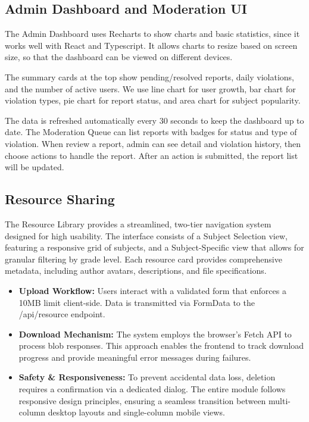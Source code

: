 \documentclass[a4paper,12pt]{report}
\begin{document}
\subsection{Admin Dashboard and Moderation UI}

The Admin Dashboard uses Recharts to show charts and basic statistics, since it works well with React and Typescript. It allows charts to resize based on screen size, so that the dashboard can be viewed on different devices.

The summary cards at the top show pending/resolved reports, daily violations, and the number of active users. We use line chart for user growth, bar chart for violation types, pie chart for report status, and area chart for subject popularity.

The data is refreshed automatically every 30 seconds to keep the dashboard up to date. The Moderation Queue can list reports with badges for status and type of violation. When review a report, admin can see detail and violation history, then choose actions to handle the report. After an action is submitted, the report list will be updated.

\subsection{Resource Sharing}

The Resource Library provides a streamlined, two-tier navigation system designed for high usability. The interface consists of a Subject Selection view, featuring a responsive grid of subjects, and a Subject-Specific view that allows for granular filtering by grade level. Each resource card provides comprehensive metadata, including author avatars, descriptions, and file specifications.

\begin{itemize}
    \item \textbf{Upload Workflow:} Users interact with a validated form that enforces a 10MB limit client-side. Data is transmitted via FormData to the /api/resource endpoint.
    \item \textbf{Download Mechanism:} The system employs the browser's Fetch API to process blob responses. This approach enables the frontend to track download progress and provide meaningful error messages during failures.
    \item \textbf{Safety \& Responsiveness:} To prevent accidental data loss, deletion requires a confirmation via a dedicated dialog. The entire module follows responsive design principles, ensuring a seamless transition between multi-column desktop layouts and single-column mobile views.
\end{itemize}
\end{document}
